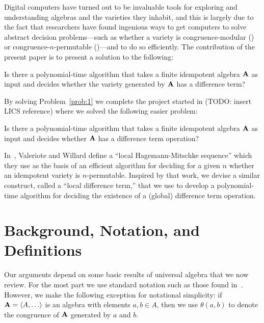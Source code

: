 Digital computers have turned out to be invaluable tools for exploring and
understanding algebras and the varieties they inhabit, and this is largely due
to the fact that researchers have found ingenious ways
to get computers to solve abstract decision problems---such as
whether a variety is 
congruence-modular (\cite{Freese:2009}) or
congruence-$n$-permutable (\cite{MR3239624})---and to do so efficiently.
The contribution of the present paper is to present a solution to the following:
\begin{prob}
  \label{prob:1}
  Is there a polynomial-time algorithm that takes a finite
  idempotent algebra $\mathbf{A}$ as input and decides whether the variety generated by
  $\mathbf{A}$ has a difference term?
\end{prob}
By solving Problem~\ref{prob:1} we complete the project started in
(TODO: insert LICS reference) where we solved the
following easier problem:
\begin{prob}
  \label{prob:2}
  Is there a polynomial-time algorithm that takes a finite
  idempotent algebra $\mathbf{A}$ as input and decides whether 
  $\mathbf{A}$ has a difference term operation?
\end{prob}

In~\cite{MR3239624},
Valeriote and Willard define 
a ``local Hagemann-Mitschke sequence'' which they use as the basis of
an efficient algorithm for deciding for a given $n$ whether an idempotent
variety is $n$-permutable. 
Inspired by that work, we devise a similar construct, called
a ``local difference term,'' that we use to develop a polynomial-time
algorithm for deciding the existence of a (global) difference term operation.


\section{Background, Notation, and Definitions}
\label{sec:definitions}
Our arguments depend on some basic results of universal algebra that we now review.
For the most part we use standard notation such as those found in~\cite{MR2839398}.
However, we make the following exception for notational simplicity:
if $\bA =\<A, \dots\>$ is an algebra with elements 
$a, b \in A$, then we use $\theta(a,b)$ to denote
the congruence of $\mathbf{A}$ generated by $a$ and $b$.

\renewcommand{\Cg}{\ensuremath{\theta}}

